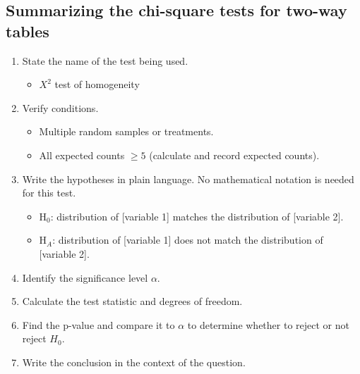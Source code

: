 \subsection{Summarizing the chi-square tests for two-way tables\vspace{-3mm}}

\begin{termBox}{
\begin{enumerate}
\setlength{\itemsep}{0mm}
\item State the name of the test being used.
\begin{itemize}
\setlength{\itemsep}{0mm}
\item $X^2$ test of homogeneity
\end{itemize}
\item Verify conditions.
\begin{itemize}
\setlength{\itemsep}{0mm}
\item Multiple random samples or treatments.
\item All expected counts $\ge 5$ (calculate and record expected counts).
\end{itemize}
\item Write the hypotheses in plain language. No mathematical notation is needed for this test.\vspace{-2mm}
\begin{itemize}
\item H$_0$: distribution of [variable 1] matches the distribution of [variable 2].
\item H$_A$: distribution of [variable 1] does not match the distribution of [variable 2].
\end{itemize}
\item Identify the significance level $\alpha$.
\item Calculate the test statistic and degrees of freedom.%
\item Find the p-value and compare it to $\alpha$ to determine whether to reject or not reject $H_0$.
\item Write the conclusion in the context of the question.
\end{enumerate}}
\end{termBox}

